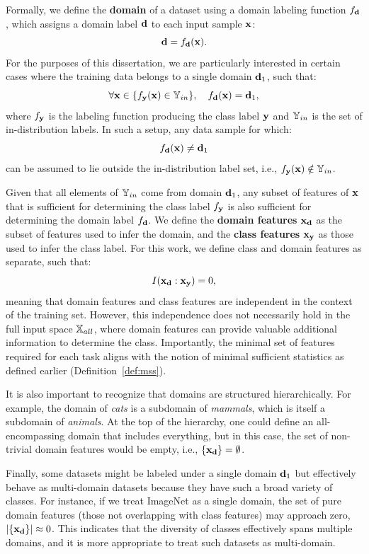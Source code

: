 \documentclass[11pt, oneside]{book}
\theoremstyle{plain}
\theoremstyle{definition}
\theoremstyle{remark}
\begin{document}
Formally, we define the \textbf{domain} of a dataset using a domain labeling function \( f_{{\mathbf{d}}} \), which assigns a domain label \( {\mathbf{d}} \) to each input sample \( {\mathbf{x}} \):
\[
{\mathbf{d}} = f_{{\mathbf{d}}}({\mathbf{x}}).
\]
For the purposes of this dissertation, we are particularly interested in certain cases where the training data belongs to a single domain \( {\mathbf{d}}_1 \), such that:
\[
\forall {\mathbf{x}} \in \{ f_{{\mathbf{y}}}({\mathbf{x}}) \in {\mathbb{Y}}_{in} \}, \quad f_{{\mathbf{d}}}({\mathbf{x}}) = {\mathbf{d}}_1,
\]
where \( f_{{\mathbf{y}}} \) is the labeling function producing the class label \( {\mathbf{y}} \) and \( {\mathbb{Y}}_{in} \) is the set of in-distribution labels. In such a setup, any data sample for which:
\[
f_{{\mathbf{d}}}({\mathbf{x}}) \neq {\mathbf{d}}_1
\]
can be assumed to lie outside the in-distribution label set, i.e., \( f_{{\mathbf{y}}}({\mathbf{x}}) \notin {\mathbb{Y}}_{in} \).

Given that all elements of \( {\mathbb{Y}}_{in} \) come from domain \( {\mathbf{d}}_1 \), any subset of features of \( {\mathbf{x}} \) that is sufficient for determining the class label \( f_{{\mathbf{y}}} \) is also sufficient for determining the domain label \( f_{{\mathbf{d}}} \). We define the \textbf{domain features} \( {\mathbf{x}}_{{\mathbf{d}}} \) as the subset of features used to infer the domain, and the \textbf{class features} \( {\mathbf{x}}_{{\mathbf{y}}} \) as those used to infer the class label. For this work, we define class and domain features as separate, such that:
\[
I({\mathbf{x}}_{{\mathbf{d}}} : {\mathbf{x}}_{{\mathbf{y}}}) = 0,
\]
meaning that domain features and class features are independent in the context of the training set. However, this independence does not necessarily hold in the full input space \( {\mathbb{X}}_{all} \), where domain features can provide valuable additional information to determine the class. Importantly, the minimal set of features required for each task aligns with the notion of minimal sufficient statistics as defined earlier (Definition~\ref{def:mss}).

It is also important to recognize that domains are structured hierarchically. For example, the domain of \textit{cats} is a subdomain of \textit{mammals}, which is itself a subdomain of \textit{animals}. At the top of the hierarchy, one could define an all-encompassing domain that includes everything, but in this case, the set of non-trivial domain features would be empty, i.e., \( \{{\mathbf{x}}_{{\mathbf{d}}}\} = \emptyset \).

Finally, some datasets might be labeled under a single domain \( {\mathbf{d}}_1 \) but effectively behave as multi-domain datasets because they have such a broad variety of classes. For instance, if we treat ImageNet as a single domain, the set of pure domain features (those not overlapping with class features) may approach zero, \( |\{{\mathbf{x}}_{{\mathbf{d}}}\}| \approx 0 \). This indicates that the diversity of classes effectively spans multiple domains, and it is more appropriate to treat such datasets as multi-domain.
\end{document}
